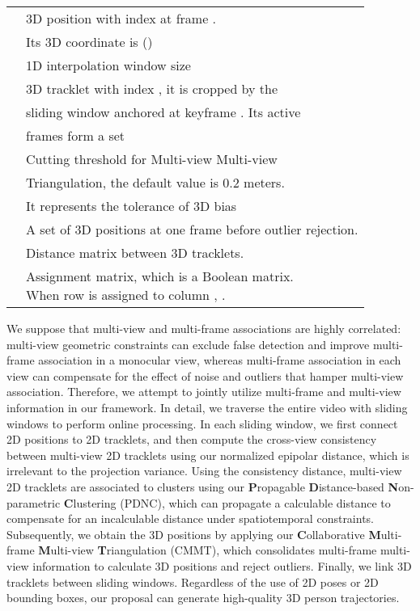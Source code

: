 \documentclass{CVM}
\begin{document}
\begin{table}[!h]
{\begin{tabular}{cl}
\multirow{2}{*}{} & 3D position with index  at frame . \\ &Its 3D coordinate is ()\\ \midrule
 & 1D interpolation window size  \\\midrule
\multirow{3}{*}{} & 3D tracklet with index , it is cropped by the \\&sliding window anchored at keyframe .  Its active \\ & frames form a set  \\  \midrule
\multirow{3}{*}{} & Cutting threshold for Multi-view Multi-view \\ & Triangulation, the default value is 0.2 meters.\\ & It represents the tolerance of 3D bias \\\midrule
 & A set of 3D positions at one frame before outlier rejection. \\  \midrule
 & Distance matrix between 3D tracklets. \\  \midrule
 & \makecell[l]{Assignment matrix, which is a Boolean matrix.\\ When row  is assigned to column , .}
\\\bottomrule
\end{tabular}}
\end{table}


We suppose that multi-view and multi-frame associations are highly correlated: multi-view geometric constraints can exclude false detection and improve multi-frame association in a monocular view, whereas multi-frame association in each view can compensate for the effect of noise and outliers that hamper multi-view association. Therefore, we attempt to jointly utilize multi-frame and multi-view information in our framework. In detail, we traverse the entire video with sliding windows to perform online processing. In each sliding window, we first connect 2D positions to 2D tracklets, and then compute the cross-view consistency between multi-view 2D tracklets using our normalized epipolar distance, which is irrelevant to the projection variance. Using the consistency distance, multi-view 2D tracklets are associated to clusters using our \textbf{P}ropagable \textbf{D}istance-based \textbf{N}on-parametric \textbf{C}lustering (PDNC), which can propagate a calculable distance to compensate for an incalculable distance under spatiotemporal constraints. Subsequently, we obtain the 3D positions by applying our \textbf{C}ollaborative \textbf{M}ulti-frame \textbf{M}ulti-view \textbf{T}riangulation (CMMT), which consolidates multi-frame multi-view information to calculate 3D positions and reject outliers. Finally, we link 3D tracklets between sliding windows. Regardless of the use of 2D poses or 2D bounding boxes, our proposal can generate high-quality 3D person trajectories.
\end{document}
